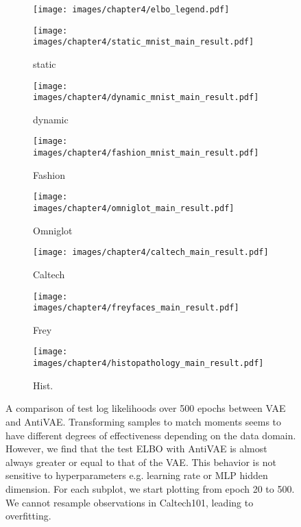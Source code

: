 \begin{figure*}[t!]
    \centering
    \begin{subfigure}[b]{\textwidth}
        \texttt{[image: images/chapter4/elbo\_legend.pdf]}
    \end{subfigure}
    \begin{subfigure}[b]{0.135\textwidth}
        \texttt{[image: images/chapter4/static\_mnist\_main\_result.pdf]}
        \caption{static}
        \label{fig:elbo_static_mnist}
    \end{subfigure}
    \begin{subfigure}[b]{0.135\textwidth}
        \texttt{[image: images/chapter4/dynamic\_mnist\_main\_result.pdf]}
        \caption{dynamic}
        \label{fig:elbo_dynamic_mnist}
    \end{subfigure}
    \begin{subfigure}[b]{0.135\textwidth}
        \texttt{[image: images/chapter4/fashion\_mnist\_main\_result.pdf]}
        \caption{Fashion}
        \label{fig:elbo_fashion_mnist}
    \end{subfigure}
    \begin{subfigure}[b]{0.135\textwidth}
        \texttt{[image: images/chapter4/omniglot\_main\_result.pdf]}
        \caption{Omniglot}
        \label{fig:elbo_omniglot}
    \end{subfigure}
    \begin{subfigure}[b]{0.135\textwidth}
        \texttt{[image: images/chapter4/caltech\_main\_result.pdf]}
        \caption{Caltech}
        \label{fig:elbo_caltech}
    \end{subfigure}
    \begin{subfigure}[b]{0.135\textwidth}
        \texttt{[image: images/chapter4/freyfaces\_main\_result.pdf]}
        \caption{Frey}
        \label{fig:elbo_freyfaces}
    \end{subfigure}
    \begin{subfigure}[b]{0.135\textwidth}
        \texttt{[image: images/chapter4/histopathology\_main\_result.pdf]}
        \caption{Hist.}
        \label{fig:elbo_histopathology}
    \end{subfigure}
\caption{A comparison of test log likelihoods over 500 epochs between VAE and AntiVAE. Transforming samples to match moments seems to have different degrees of effectiveness depending on the data domain. However, we find that the test ELBO with AntiVAE is almost always greater or equal to that of the VAE. This behavior is not sensitive to hyperparameters e.g. learning rate or MLP hidden dimension. For each subplot, we start plotting from epoch 20 to 500. We cannot resample observations in Caltech101, leading to overfitting.}
\label{fig:learning_trajectory}
\end{figure*}

